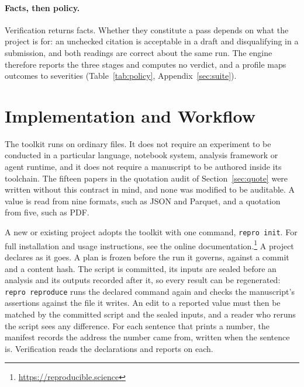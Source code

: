 \documentclass{article}
\newcommand{\code}[1]{\texttt{#1}}
\begin{document}
\paragraph{Facts, then policy.} Verification returns facts. Whether they constitute a pass depends
on what the project is for: an unchecked citation is acceptable in a draft and disqualifying in a
submission, and both readings are correct about the same run. The engine therefore reports the
three stages and computes no verdict, and a profile maps outcomes to severities
(Table~\ref{tab:policy}, Appendix~\ref{sec:suite}).

\section{Implementation and Workflow}
\label{sec:use}

The toolkit runs on ordinary files. It does not require an experiment to be conducted in a
particular language, notebook system, analysis framework or agent runtime, and it does not require
a manuscript to be authored inside its toolchain. The fifteen papers in the quotation audit of Section~\ref{sec:quote} were
written without this contract in mind, and none was modified to be auditable. A value is read
from nine formats, such as JSON and Parquet, and a quotation from five, such as PDF.

A new or existing project adopts the toolkit with one command, \code{repro init}. For full installation and usage instructions, see the online documentation.\footnote{\url{https://reproducible.science}} A project declares as it goes. A plan is frozen before the run it governs, against a commit and a
content hash. The script is committed, its inputs are sealed before an analysis and its outputs recorded after
it, so every result can be regenerated: \code{repro reproduce} runs the declared command again and checks the manuscript's assertions
against the file it writes. An edit to a reported value must then be matched by the committed script and the sealed
inputs, and a reader who reruns the script sees any difference. For each sentence that prints a number, the manifest records the address the number came from,
written when the sentence is. Verification reads the declarations and reports on each.
\end{document}
